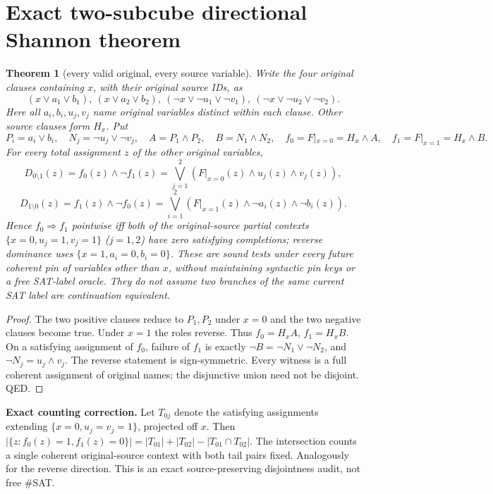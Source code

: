 \documentclass[11pt]{article}
\newtheorem{theorem}{Theorem}
\begin{document}
\section{Exact two-subcube directional Shannon theorem}
\begin{theorem}[every valid original, every source variable]
Write the four original clauses containing $x$, with their original source IDs, as
\[
(x\vee a_1\vee b_1),\ (x\vee a_2\vee b_2),\
(\neg x\vee\neg u_1\vee\neg v_1),\ (\neg x\vee\neg u_2\vee\neg v_2).
\]
Here all $a_i,b_i,u_j,v_j$ name original variables distinct \emph{within} each clause. Other source clauses form $H_x$. Put
\[
P_i=a_i\vee b_i,\quad N_j=\neg u_j\vee\neg v_j,\quad
A=P_1\wedge P_2,\quad B=N_1\wedge N_2,\quad
f_0=F|_{x=0}=H_x\wedge A,\quad f_1=F|_{x=1}=H_x\wedge B.
\]
For every total assignment $z$ of the other original variables,
\[
D_{0\setminus1}(z)=f_0(z)\wedge\neg f_1(z)
=\bigvee_{j=1}^{2}\left(F|_{x=0}(z)\wedge u_j(z)\wedge v_j(z)\right),
\tag{1}
\]
\[
D_{1\setminus0}(z)=f_1(z)\wedge\neg f_0(z)
=\bigvee_{i=1}^{2}\left(F|_{x=1}(z)\wedge\neg a_i(z)\wedge\neg b_i(z)\right).
\tag{2}
\]
Hence $f_0\Rightarrow f_1$ pointwise iff \emph{both} of the original-source partial contexts
$\{x=0,u_j=1,v_j=1\}$ ($j=1,2$) have zero satisfying completions; reverse dominance uses $\{x=1,a_i=0,b_i=0\}$. These are sound tests under \emph{every future coherent pin} of variables other than $x$, without maintaining syntactic pin keys or a free SAT-label oracle. They do not assume two branches of the same current SAT label are continuation equivalent.
\end{theorem}
\begin{proof}
The two positive clauses reduce to $P_1,P_2$ under $x=0$ and the two negative clauses become true. Under $x=1$ the roles reverse. Thus $f_0=H_x A$, $f_1=H_x B$. On a satisfying assignment of $f_0$, failure of $f_1$ is exactly $\neg B=\neg N_1\vee\neg N_2$, and $\neg N_j=u_j\wedge v_j$. The reverse statement is sign-symmetric. Every witness is a full coherent assignment of original names; the disjunctive union need not be disjoint. QED.
\end{proof}

\noindent\textbf{Exact counting correction.} Let $T_{0j}$ denote the satisfying assignments extending $\{x=0,u_j=v_j=1\}$, projected off $x$. Then
$|\{z:f_0(z)=1,f_1(z)=0\}|=|T_{01}|+|T_{02}|-|T_{01}\cap T_{02}|$.
The intersection counts a single coherent original-source context with both tail pairs fixed. Analogously for the reverse direction. This is an exact source-preserving disjointness audit, not free \#SAT.
\end{document}
